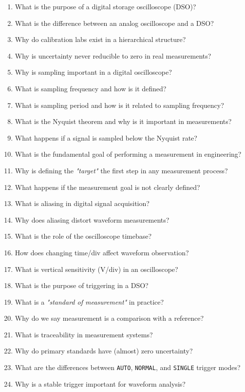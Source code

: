 \documentclass[../main.tex]{subfiles}
\begin{document}
\begin{enumerate}[label=\textbf{\arabic*.}]

	\item What is the purpose of a digital storage oscilloscope (DSO)?
	\item What is the difference between an analog oscilloscope and a DSO?
	\item Why do calibration labs exist in a hierarchical structure?
	\item Why is uncertainty never reducible to zero in real measurements?
	\item Why is sampling important in a digital oscilloscope?
	\item What is sampling frequency and how is it defined?
	\item What is sampling period and how is it related to sampling frequency?
	\item What is the Nyquist theorem and why is it important in measurements?
	\item What happens if a signal is sampled below the Nyquist rate?
	\item What is the fundamental goal of performing a measurement in engineering?
	\item Why is defining the \textit{"target"} the first step in any measurement process?
	\item What happens if the measurement goal is not clearly defined?
	\item What is aliasing in digital signal acquisition?
	\item Why does aliasing distort waveform measurements?
	\item What is the role of the oscilloscope timebase?
	\item How does changing time/div affect waveform observation?
	\item What is vertical sensitivity (V/div) in an oscilloscope?
	\item What is the purpose of triggering in a DSO?
	\item What is a \textit{"standard of measurement"} in practice?
	\item Why do we say measurement is a comparison with a reference?
	\item What is traceability in measurement systems?
	\item Why do primary standards have (almost) zero uncertainty?
	\item What are the differences between \texttt{AUTO}, \texttt{NORMAL}, and \texttt{SINGLE} trigger modes?
	\item Why is a stable trigger important for waveform analysis?

\end{enumerate}
\end{document}
